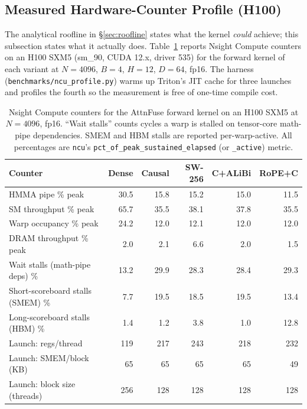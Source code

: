 \subsection{Measured Hardware-Counter Profile (H100)}
\label{sec:ncu}

The analytical roofline in \S\ref{sec:roofline} states what the kernel
\emph{could} achieve; this subsection states what it actually does.
Table~\ref{tab:ncu} reports Nsight Compute counters on an H100 SXM5
(sm\_90, CUDA 12.x, driver 535) for the forward kernel of each variant
at $N{=}4096$, $B{=}4$, $H{=}12$, $D{=}64$, fp16. The harness
(\texttt{benchmarks/ncu\_profile.py}) warms up Triton's JIT cache for
three launches and profiles the fourth so the measurement is free of
one-time compile cost.

\begin{table}[h]
\centering
\small
\begin{tabular}{lrrrrr}
\toprule
\textbf{Counter} & \textbf{Dense} & \textbf{Causal} & \textbf{SW-256} & \textbf{C+ALiBi} & \textbf{RoPE+C} \\
\midrule
HMMA pipe \% peak                       & 30.5 & 15.8 & 15.2 & 15.0 & 11.5 \\
SM throughput \% peak                   & 65.7 & 35.5 & 38.1 & 37.8 & 35.5 \\
Warp occupancy \% peak                  & 24.2 & 12.0 & 12.1 & 12.0 & 12.0 \\
DRAM throughput \% peak                 &  2.0 &  2.1 &  6.6 &  2.0 &  1.5 \\
Wait stalls (math-pipe deps) \%         & 13.2 & 29.9 & 28.3 & 28.4 & 29.3 \\
Short-scoreboard stalls (SMEM) \%       &  7.7 & 19.5 & 18.5 & 19.5 & 13.4 \\
Long-scoreboard stalls (HBM) \%         &  1.4 &  1.2 &  3.8 &  1.0 & 12.8 \\
\midrule
Launch: regs/thread                     &  119 &  217 &  243 &  218 &  232 \\
Launch: SMEM/block (KB)                 &   65 &   65 &   65 &   65 &   49 \\
Launch: block size (threads)            &  256 &  128 &  128 &  128 &  128 \\
\bottomrule
\end{tabular}
\caption{Nsight Compute counters for the AttnFuse forward kernel on
an H100 SXM5 at $N{=}4096$, fp16. ``Wait stalls'' counts cycles a warp
is stalled on tensor-core math-pipe dependencies. SMEM and HBM stalls
are reported per-warp-active. All percentages are \texttt{ncu}'s
\texttt{pct\_of\_peak\_sustained\_elapsed} (or \texttt{\_active}) metric.}
\label{tab:ncu}
\end{table}

